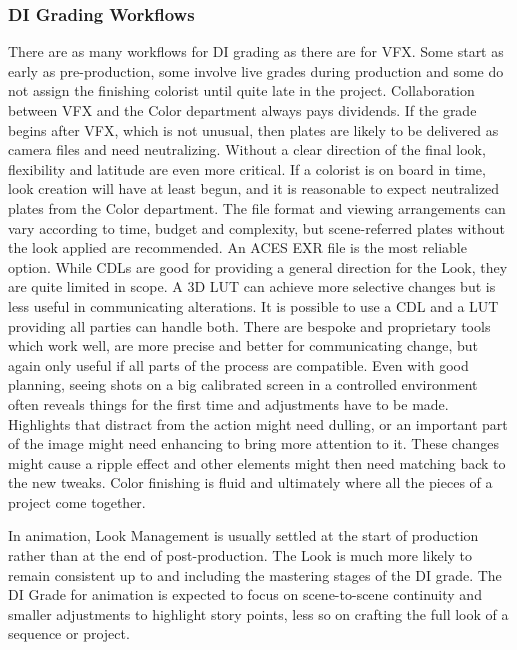 \subsubsection{DI Grading Workflows}
\label{subsubsec:di-grading-workflows}

There are as many workflows for DI grading as there are for VFX. Some start as early as pre-production, some involve live grades during production and some do not assign the finishing colorist until quite late in the project. Collaboration between VFX and the Color department always pays dividends. If the grade begins after VFX, which is not unusual, then plates are likely to be delivered as camera files and need neutralizing. Without a clear direction of the final look, flexibility and latitude are even more critical. If a colorist is on board in time, look creation will have at least begun, and it is reasonable to expect neutralized plates from the Color department. The file format and viewing arrangements can vary according to time, budget and complexity, but scene-referred plates without the look applied are recommended. An ACES EXR file is the most reliable option.  While CDLs are good for providing a general direction for the Look, they are quite limited in scope. A 3D LUT can achieve more selective changes but is less useful in communicating alterations. It is possible to use a CDL and a LUT providing all parties can handle both. There are bespoke and proprietary tools which work well, are more precise and better for communicating change, but again only useful if all parts of the process are compatible. Even with good planning, seeing shots on a big calibrated screen in a controlled environment often reveals things for the first time and adjustments have to be made.  Highlights that distract from the action might need dulling, or an important part of the image might need enhancing to bring more attention to it. These changes might cause a ripple effect and other elements might then need matching back to the new tweaks. Color finishing is fluid and ultimately where all the pieces of a project come together.

In animation, Look Management is usually settled at the start of production rather than at the end of post-production. The Look is much more likely to remain consistent up to and including the mastering stages of the DI grade. The DI Grade for animation is expected to focus on scene-to-scene continuity and smaller adjustments to highlight story points, less so on crafting the full look of a sequence or project.

